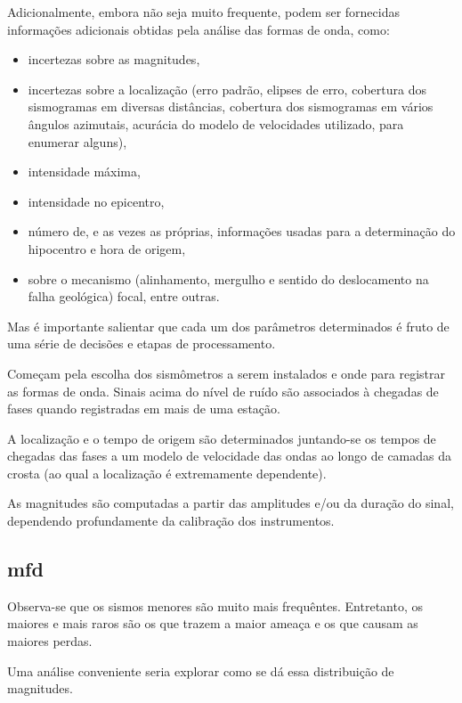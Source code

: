Adicionalmente, embora não seja muito frequente, podem ser fornecidas informações adicionais obtidas pela análise das formas de
onda, como:

\begin{itemize}\setlength{\itemsep}{0em}
	\item incertezas sobre as magnitudes,
	\item incertezas sobre a localização (erro padrão, elipses de erro, cobertura dos sismogramas em diversas distâncias, cobertura
	dos sismogramas em vários ângulos azimutais, acurácia do modelo de velocidades utilizado, para enumerar alguns),
	\item intensidade máxima,
	\item intensidade no epicentro,
	\item número de, e as vezes as próprias, informações usadas para a determinação do hipocentro e hora de origem,
	\item sobre o mecanismo (alinhamento, mergulho e sentido do deslocamento na falha geológica) focal, entre outras.
\end{itemize} 

Mas é importante salientar \citep{woessner_catalog_2010} que cada um dos parâmetros determinados é fruto de uma série de decisões
e etapas de processamento.

Começam pela escolha dos sismômetros a serem instalados e onde para registrar as formas de onda. Sinais acima do nível de ruído
são associados à chegadas de fases quando registradas em mais de uma estação. 

A localização e o tempo de origem são
determinados juntando-se os tempos de chegadas das fases a um modelo de velocidade das ondas ao longo de camadas da crosta (ao
qual a localização é extremamente dependente). 

As magnitudes são computadas a partir das amplitudes e/ou da duração do sinal, dependendo profundamente da calibração dos
instrumentos.

\subsection{\glsdesc{mfd}}
\label{sec:mfd}

Observa-se que os sismos menores são muito mais frequêntes.
Entretanto, os maiores e mais raros são os que trazem a maior ameaça e os que causam as maiores perdas.

Uma análise conveniente seria explorar como se dá essa distribuição de magnitudes.

